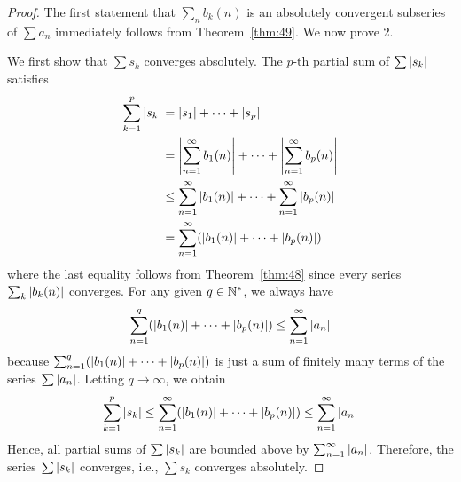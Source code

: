 \documentclass[thmcnt=section, 12pt]{my-elegantbook}
\begin{document}
\begin{proof}
    The first statement that $\sum_n b_k(n)$ is an absolutely convergent subseries of $\sum a_n$ immediately follows from Theorem~\ref{thm:49}. We now prove 2.

    We first show that $\sum s_k$ converges absolutely. The $p$-th partial sum of $\sum \left\lvert s_k \right\rvert$ satisfies
    \begin{align*}
        \sum_{k=1}^p \left\lvert s_k \right\rvert
         & = \left\lvert s_1 \right\rvert + \cdots + \left\lvert s_p \right\rvert             \\
         & = \left\lvert  \sum_{n=1}^\infty b_1(n)  \right\rvert + \cdots
        + \left\lvert  \sum_{n=1}^\infty b_p(n)  \right\rvert              \\
         & \leq \sum_{n=1}^\infty \left\lvert b_1(n) \right\rvert + \cdots
        + \sum_{n=1}^\infty \left\lvert b_p(n) \right\rvert                \\
         & = \sum_{n=1}^\infty ( \left\lvert b_1(n) \right\rvert + \cdots
        + \left\lvert b_p(n) \right\rvert )
    \end{align*}
    where the last equality follows from Theorem~\ref{thm:48} since every series $\sum_{k} \left\lvert b_k(n) \right\rvert$ converges. For any given $q \in \mathbb{N}^\ast$, we always have
    \begin{align*}
        \sum_{n=1}^q ( \left\lvert b_1(n) \right\rvert + \cdots
        + \left\lvert b_p(n) \right\rvert )
        \leq \sum_{n=1}^\infty \left\lvert a_n \right\rvert
    \end{align*}
    because $\sum_{n=1}^q ( \left\lvert b_1(n) \right\rvert + \cdots + \left\lvert b_p(n) \right\rvert )$ is just a sum of finitely many terms of the series $\sum \left\lvert a_n \right\rvert$. Letting $q \to \infty$, we obtain
    \begin{align*}
        \sum_{k=1}^p \left\lvert s_k \right\rvert
        \leq \sum_{n=1}^\infty ( \left\lvert b_1(n) \right\rvert + \cdots
        + \left\lvert b_p(n) \right\rvert )
        \leq \sum_{n=1}^\infty \left\lvert a_n \right\rvert
    \end{align*}
    Hence, all partial sums of $\sum \left\lvert s_k \right\rvert$ are bounded above by $\sum_{n=1}^\infty \left\lvert a_n \right\rvert$. Therefore, the series $\sum \left\lvert s_k \right\rvert$ converges, i.e., $\sum s_k$ converges absolutely.


\end{proof}
\end{document}

